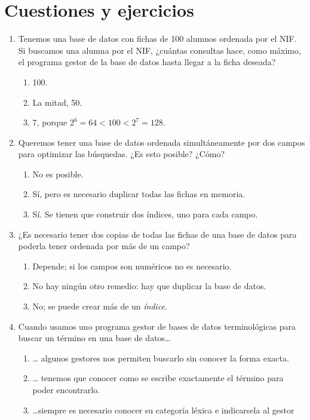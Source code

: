 \section{Cuestiones y ejercicios} \begin{enumerate} 

\item Tenemos una base de datos con fichas de 100 alumnos ordenada por el NIF. Si buscamos una alumna por el NIF, ¿cuántas consultas hace, como máximo, el programa gestor de la base de datos hasta llegar a la ficha deseada? \begin{enumerate} \item 100. \item La mitad, 50. \item 7, porque \(2^6=64 < 100 < 2^7=128\). \end{enumerate} 

\item Queremos tener una base de datos ordenada simultáneamente por dos campos para optimizar las búsquedas. ¿Es esto posible? ¿Cómo? \begin{enumerate} \item No es posible. \item Sí, pero es necesario duplicar todas las fichas en memoria. \item Sí. Se tienen que construir dos índices, uno para cada campo. \end{enumerate} 

\item ¿Es necesario tener dos copias de todas las fichas de una base de datos para poderla tener ordenada por más de un campo? \begin{enumerate} \item Depende; si los campos son numéricos no es necesario. \item No hay ningún otro remedio: hay que duplicar la base de datos. \item No; se puede crear más de un \emph{índice}. \end{enumerate} 

\item Cuando usamos uno programa gestor de bases de datos terminológicas para buscar un término en una base de datos{\ldots} \begin{enumerate} \item {\ldots} algunos gestores nos permiten buscarlo sin conocer la forma exacta. \item {\ldots} tenemos que conocer como se escribe exactamente el término para poder encontrarlo. \item {\ldots}siempre es necesario conocer su categoría léxica e indicarsela al gestor \end{enumerate} 


\end{enumerate}
